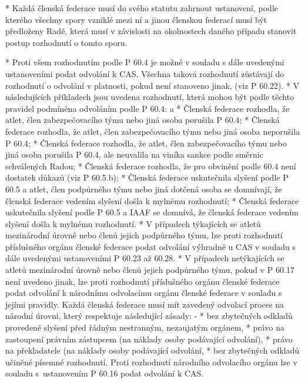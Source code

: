 * Každá členská federace musí do svého statutu zahrnout ustanovení, podle kterého všechny spory vzniklé mezi ní a jinou členskou federací musí být předloženy Radě, která musí v závislosti na okolnostech daného případu stanovit postup rozhodnutí o tomto sporu.

* Proti všem rozhodnutím podle P 60.4  je možné v souladu s dále uvedenými ustanoveními podat odvolání k CAS. Všechna taková rozhodnutí zůstávají do rozhodnutí o odvolání v platnosti, pokud není stanoveno jinak, (viz P 60.22).
* V následujících příkladech jsou uvedena rozhodnutí, která mohou být podle těchto pravidel  podmíněna odvoláním podle P 60.4:
  \begitems \style a
  * Členská federace rozhodla, že atlet, člen zabezpečovacího týmu nebo jiná osoba porušila P 60.4;
  * Členská federace rozhodla, že atlet, člen zabezpečovacího týmu nebo jiná osoba neporušila P 60.4;
  * Členská federace rozhodla, že atlet, člen zabezpečovacího týmu nebo jiná osoba porušila P 60.4, ale neuvalila na viníka sankce podle směrnic schválených Radou;
  * Členská federace rozhodla, že pro obvinění podle 60.4 není dostatek důkazů (viz P 60.5.b);
  * Členská federace uskutečnila slyšení podle P 60.5 a atlet, člen podpůrného týmu nebo jiná dotčená osoba se domnívají, že členská federace vedením slyšení došla k mylnému rozhodnutí;
  * Členská federace uskutečnila slyšení podle P 60.5 a IAAF se domnívá, že členská federace vedením slyšení došla k mylnému rozhodnutí.
  \enditems
* V případech týkajících se atletů mezinárodní úrovně nebo členů jejich podpůrného týmu, lze proti rozhodnutí příslušného orgánu členské federace podat odvolání výhradně u CAS v souladu s dále uvedenými ustanoveními P 60.23 až 60.28.
* V případech netýkajících se atletů mezinárodní úrovně nebo členů jejich podpůrného týmu, pokud  v P 60.17 není uvedeno jinak, lze proti rozhodnutí příslušného orgánu členské federace podat odvolání k národnímu odvolacímu orgánu členské federace v souladu s jejími pravidly. Každá členská federace musí mít zavedený odvolací proces na národní úrovni, který respektuje následující zásady:
  \begitems \style -
  * bez zbytečných odkladů provedené slyšení před řádným nestranným, nezaujatým orgánem,
  * právo na zastoupení právním zástupcem (na náklady osoby podávající odvolání),
  * právo na překladatele (na náklady osoby podávající odvolání,
  * bez zbytečných odkladů učiněné písemné rozhodnutí.
  \enditems
Proti rozhodnutí národního odvolacího orgánu lze v souladu s~ustanovením P 60.16 podat odvolání k CAS.

